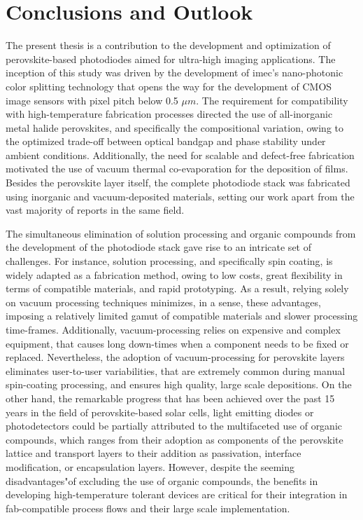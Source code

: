 \chapter{Conclusions and Outlook}\label{ch:conclusion}

The present thesis is a contribution to the development and optimization of perovskite-based photodiodes aimed for ultra-high imaging applications. The inception of this study was driven by the development of imec's nano-photonic color splitting technology that opens the way for the development of CMOS image sensors with pixel pitch below 0.5 $\mu m$. The requirement for compatibility with high-temperature fabrication processes directed the use of all-inorganic metal halide perovskites, and specifically the  compositional variation, owing to the optimized trade-off between optical bandgap and phase stability under ambient conditions. Additionally, the need for scalable and defect-free fabrication motivated the use of vacuum thermal co-evaporation for the deposition of  films. Besides the perovskite layer itself, the complete photodiode stack was fabricated using inorganic and vacuum-deposited materials, setting our work apart from the vast majority of reports in the same field. 

The simultaneous elimination of solution processing and organic compounds from the development of the photodiode stack gave rise to an intricate set of challenges. For instance, solution processing, and specifically spin coating, is widely adapted as a fabrication method, owing to low costs, great flexibility in terms of compatible materials, and rapid prototyping. As a result, relying solely on vacuum processing techniques minimizes, in a sense, these advantages, imposing a relatively limited gamut of compatible materials and slower processing time-frames. Additionally, vacuum-processing relies on expensive and complex equipment, that causes long down-times when a component needs to be fixed or replaced. Nevertheless, the adoption of vacuum-processing for perovskite layers eliminates user-to-user variabilities, that are extremely common during manual spin-coating processing, and ensures high quality, large scale depositions. On the other hand, the remarkable progress that has been achieved over the past 15 years in the field of perovskite-based solar cells, light emitting diodes or photodetectors could be partially attributed to the multifaceted use of organic compounds, which ranges from their adoption as components of the perovskite lattice and transport layers to their addition as passivation, interface modification, or encapsulation layers. However, despite the seeming disadvantages"of excluding the use of organic compounds, the benefits in developing high-temperature tolerant devices are critical for their integration in fab-compatible process flows and their large scale implementation. 

